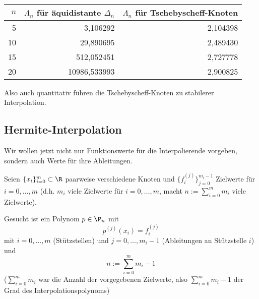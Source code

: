 \documentclass[11pt]{scrbook}
\begin{document}
\begin{ex*}~

	\begin{table}[!ht]
		\centering
		\begin{tabular}{r|r|r}
			$n$ & $\Lambda_n$ für äquidistante $\Delta_n$ & $\Lambda_n$ für Tschebyscheff-Knoten \\ \hline
			5 & 3,106292 & 2,104398 \\
			10 & 29,890695 & 2,489430 \\
			15 & 512,052451 & 2,727778 \\
			20 & 10986,533993 & 2,900825
		\end{tabular}
	\end{table}		
	Also auch quantitativ führen die Tschebyscheff-Knoten zu stabilerer Interpolation.
\end{ex*}


\subsection{Hermite-Interpolation}

Wir wollen jetzt nicht nur Funktionswerte für die Interpolierende vorgeben, sondern auch Werte für ihre Ableitungen.

Seien $\{x_i\}_{i=0}^m \subset \R$ paarweise verschiedene Knoten und $\{f_i^{(j)}\}_{j=0}^{m_i-1}$ Zielwerte für $i=0,\dotsc, m$ (d.h. $m_i$ viele Zielwerte für $i=0,\dotsc, m$, macht $n := \sum_{i=0}^m m_i$ viele Zielwerte).

Gesucht ist ein Polynom $p\in \P_n$ mit 
\[
	p^{(j)}(x_i) =f_i^{(j)}
\]
mit $i=0,\dotsc,m$ (Stützstellen) und $j=0,\dotsc,m_i-1$ (Ableitungen an Stützstelle $i$) und 
\[
	n := \sum_{i=0}^m m_i - 1
\]
($\sum_{i=0}^m m_i$ war die Anzahl der vorgegebenen Zielwerte, also $\sum_{i=0}^m m_i -1$ der Grad des Interpolationspolynoms)
\end{document}
